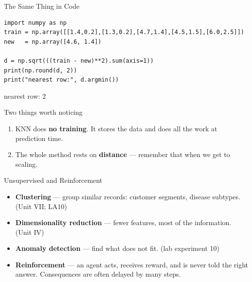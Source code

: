 \documentclass[aspectratio=169]{beamer}
\begin{document}
\begin{frame}[fragile,shrink=10]{The Same Thing in Code}
  \begin{lstlisting}
import numpy as np
train = np.array([[1.4,0.2],[1.3,0.2],[4.7,1.4],[4.5,1.5],[6.0,2.5]])
new   = np.array([4.6, 1.4])

d = np.sqrt(((train - new)**2).sum(axis=1))
print(np.round(d, 2))
print("nearest row:", d.argmin())
  \end{lstlisting}
  \begin{outblk}
[3.42 3.51 0.1  0.14 1.78]
nearest row: 2
  \end{outblk}
  \vspace{0.2em}
  \begin{block}{Two things worth noticing}
    \small
    \begin{enumerate}
      \item KNN does \textbf{no training}. It stores the data and does all the work at prediction time.
      \item The whole method rests on \textbf{distance} --- remember that when we get to scaling.
    \end{enumerate}
  \end{block}
\end{frame}

\begin{frame}[shrink=8]{Unsupervised and Reinforcement}
  \begin{itemize}[<+->]
    \item \textbf{Clustering} --- group similar records: customer segments, disease subtypes. \hfill (Unit VII; LA10)
    \item \textbf{Dimensionality reduction} --- fewer features, most of the information. \hfill (Unit IV)
    \item \textbf{Anomaly detection} --- find what does not fit. \hfill (lab experiment 10)
    \item \textbf{Reinforcement} --- an agent acts, receives reward, and is never told the right answer. Consequences are often delayed by many steps.
  \end{itemize}
  \vspace{0.2em}
\end{frame}
\end{document}
